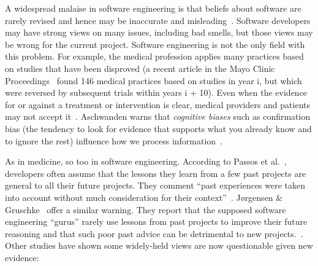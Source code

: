 \documentclass{sig-alternate}
\theoremstyle{break}
\begin{document}
A widespread malaise in software engineering is that
beliefs about software are rarely revised and hence may be
  inaccurate and 
misleading~\cite{passos11,jorgensen09,mei15,me16phase,prem16}. Software developers may have strong views on many issues, including bad smells, but those views may be wrong for the current
project.
Software engineering is not the only field with this problem.
  For example, the medical profession applies many practices based on studies that have been disproved (a recent article in the Mayo Clinic Proceedings~\cite{prasad13} found 146 medical practices based on studies in year i, but which were reversed by subsequent trials within years i + 10). Even when the evidence for or against a treatment or intervention is clear, medical providers and patients may not accept it~\cite{aschwanden10}. Aschwanden warns that {\em cognitive biases} such as confirmation bias (the tendency to look for evidence that supports what you already know and to ignore the rest) influence how we process information~\cite{aschwanden15}.

As in medicine, so too in software engineering.
According to Passos et al.~\cite{passos11},  developers often  assume that the lessons they learn from a few past projects are general to all their future projects. They comment ``past experiences were taken into account without much consideration for their context''~\cite{passos11}.  J{\o}rgensen \& Gruschke~\cite{jorgensen09} offer a similar warning. They report that the supposed software engineering ``gurus'' rarely use lessons from past projects to improve their future reasoning and that such poor past advice can be detrimental to new projects.~\cite{jorgensen09}. Other studies have shown some widely-held views are   now questionable given new evidence:
\end{document}

